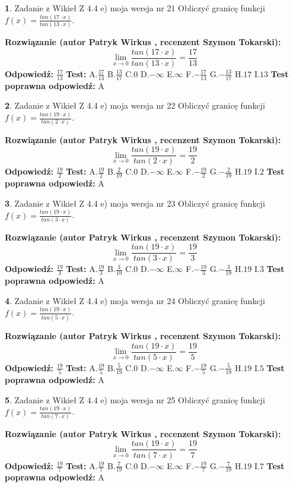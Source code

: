 \documentclass[12pt, a4paper]{article}
\theoremstyle{definition} %
\newtheorem{zad}{}
\newcommand{\zadStart}[1]{\begin{zad}#1\newline}
\newcommand{\zadStop}{\end{zad}}
\newcommand{\rozwStart}[2]{\noindent \textbf{Rozwiązanie (autor #1 , recenzent #2): }\newline}
\newcommand{\rozwStop}{\newline}
\newcommand{\odpStart}{\noindent \textbf{Odpowiedź:}\newline}
\newcommand{\odpStop}{\newline}
\newcommand{\testStart}{\noindent \textbf{Test:}\newline}
\newcommand{\testStop}{\newline}
\newcommand{\kluczStart}{\noindent \textbf{Test poprawna odpowiedź:}\newline}
\newcommand{\kluczStop}{\newline}
\begin{document}
\zadStart{Zadanie z Wikieł Z 4.4 e) moja wersja nr 21}
Obliczyć granicę funkcji $f(x)=\frac{tan(17\cdot x)}{tan(13\cdot x)}$.
\zadStop
\rozwStart{Patryk Wirkus}{Szymon Tokarski}
$$\lim\limits_{x\to 0}\frac{tan(17\cdot x)}{tan(13\cdot x)}=
\frac{17}{13}$$
\rozwStop
\odpStart
$\frac{17}{13}$
\odpStop
\testStart
A.$\frac{17}{13}$
B.$\frac{13}{17}$
C.$0$
D.$-\infty$
E.$\infty$
F.$-\frac{17}{13}$
G.$-\frac{13}{17}$
H.$17$
I.$13$
\testStop
\kluczStart
A
\kluczStop



\zadStart{Zadanie z Wikieł Z 4.4 e) moja wersja nr 22}
Obliczyć granicę funkcji $f(x)=\frac{tan(19\cdot x)}{tan(2\cdot x)}$.
\zadStop
\rozwStart{Patryk Wirkus}{Szymon Tokarski}
$$\lim\limits_{x\to 0}\frac{tan(19\cdot x)}{tan(2\cdot x)}=
\frac{19}{2}$$
\rozwStop
\odpStart
$\frac{19}{2}$
\odpStop
\testStart
A.$\frac{19}{2}$
B.$\frac{2}{19}$
C.$0$
D.$-\infty$
E.$\infty$
F.$-\frac{19}{2}$
G.$-\frac{2}{19}$
H.$19$
I.$2$
\testStop
\kluczStart
A
\kluczStop



\zadStart{Zadanie z Wikieł Z 4.4 e) moja wersja nr 23}
Obliczyć granicę funkcji $f(x)=\frac{tan(19\cdot x)}{tan(3\cdot x)}$.
\zadStop
\rozwStart{Patryk Wirkus}{Szymon Tokarski}
$$\lim\limits_{x\to 0}\frac{tan(19\cdot x)}{tan(3\cdot x)}=
\frac{19}{3}$$
\rozwStop
\odpStart
$\frac{19}{3}$
\odpStop
\testStart
A.$\frac{19}{3}$
B.$\frac{3}{19}$
C.$0$
D.$-\infty$
E.$\infty$
F.$-\frac{19}{3}$
G.$-\frac{3}{19}$
H.$19$
I.$3$
\testStop
\kluczStart
A
\kluczStop



\zadStart{Zadanie z Wikieł Z 4.4 e) moja wersja nr 24}
Obliczyć granicę funkcji $f(x)=\frac{tan(19\cdot x)}{tan(5\cdot x)}$.
\zadStop
\rozwStart{Patryk Wirkus}{Szymon Tokarski}
$$\lim\limits_{x\to 0}\frac{tan(19\cdot x)}{tan(5\cdot x)}=
\frac{19}{5}$$
\rozwStop
\odpStart
$\frac{19}{5}$
\odpStop
\testStart
A.$\frac{19}{5}$
B.$\frac{5}{19}$
C.$0$
D.$-\infty$
E.$\infty$
F.$-\frac{19}{5}$
G.$-\frac{5}{19}$
H.$19$
I.$5$
\testStop
\kluczStart
A
\kluczStop



\zadStart{Zadanie z Wikieł Z 4.4 e) moja wersja nr 25}
Obliczyć granicę funkcji $f(x)=\frac{tan(19\cdot x)}{tan(7\cdot x)}$.
\zadStop
\rozwStart{Patryk Wirkus}{Szymon Tokarski}
$$\lim\limits_{x\to 0}\frac{tan(19\cdot x)}{tan(7\cdot x)}=
\frac{19}{7}$$
\rozwStop
\odpStart
$\frac{19}{7}$
\odpStop
\testStart
A.$\frac{19}{7}$
B.$\frac{7}{19}$
C.$0$
D.$-\infty$
E.$\infty$
F.$-\frac{19}{7}$
G.$-\frac{7}{19}$
H.$19$
I.$7$
\testStop
\kluczStart
A
\kluczStop
\end{document}
